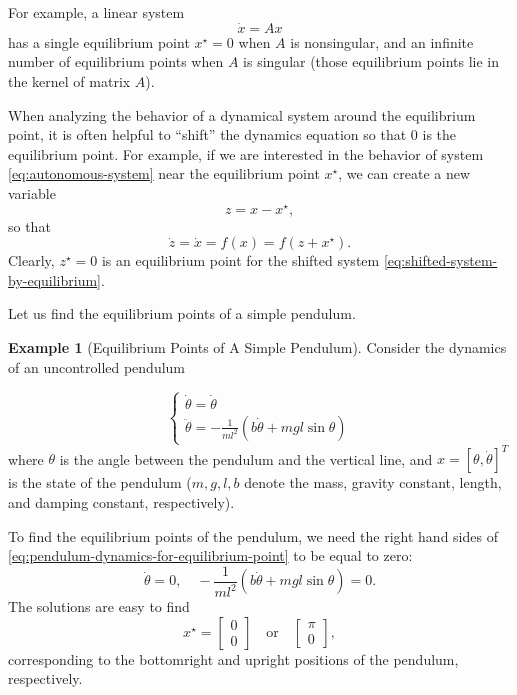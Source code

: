 \documentclass[
]{book}
\theoremstyle{definition}
\theoremstyle{definition}
\newtheorem{example}{Example}[chapter]
\theoremstyle{definition}
\theoremstyle{definition}
\theoremstyle{remark}
\begin{document}
For example, a linear system
\[
\dot{x} = A x
\]
has a single equilibrium point \(x^\star = 0\) when \(A\) is nonsingular, and an infinite number of equilibrium points when \(A\) is singular (those equilibrium points lie in the kernel of matrix \(A\)).

When analyzing the behavior of a dynamical system around the equilibrium point, it is often helpful to ``shift'' the dynamics equation so that \(0\) is the equilibrium point. For example, if we are interested in the behavior of system \eqref{eq:autonomous-system} near the equilibrium point \(x^\star\), we can create a new variable
\[
z = x - x^\star,
\]
so that
\begin{equation}
\dot{z} = \dot{x} = f(x) = f(z + x^\star).
\label{eq:shifted-system-by-equilibrium}
\end{equation}
Clearly, \(z^\star = 0\) is an equilibrium point for the shifted system \eqref{eq:shifted-system-by-equilibrium}.

Let us find the equilibrium points of a simple pendulum.

\begin{example}[Equilibrium Points of A Simple Pendulum]
\protect\hypertarget{exm:pendulumequilibriumpoint}{}\label{exm:pendulumequilibriumpoint}Consider the dynamics of an uncontrolled pendulum

\begin{equation}
\begin{cases}
\dot{\theta} = \dot{\theta} \\
\ddot{\theta} = - \frac{1}{ml^2} (b \dot{\theta} + mgl \sin \theta)
\end{cases}
\label{eq:pendulum-dynamics-for-equilibrium-point}
\end{equation}
where \(\theta\) is the angle between the pendulum and the vertical line, and \(x = [\theta,\dot{\theta}]^T\) is the state of the pendulum (\(m,g,l,b\) denote the mass, gravity constant, length, and damping constant, respectively).

To find the equilibrium points of the pendulum, we need the right hand sides of \eqref{eq:pendulum-dynamics-for-equilibrium-point} to be equal to zero:
\[
\dot{\theta} = 0, \quad - \frac{1}{ml^2} (b \dot{\theta} + mgl \sin \theta) = 0.
\]
The solutions are easy to find
\[
x^\star = \begin{bmatrix} 0 \\ 0 \end{bmatrix} \quad \text{or} \quad \begin{bmatrix} \pi \\ 0 \end{bmatrix},
\]
corresponding to the bottomright and upright positions of the pendulum, respectively.
\end{example}
\end{document}

